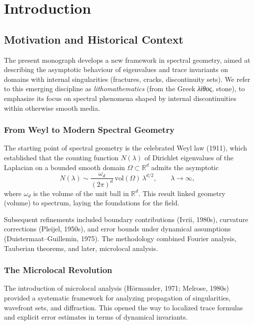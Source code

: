 \chapter{Introduction}

\section{Motivation and Historical Context}

The present monograph develops a new framework in spectral geometry, aimed at 
describing the asymptotic behaviour of eigenvalues and trace invariants on domains 
with internal singularities (fractures, cracks, discontinuity sets). 
We refer to this emerging discipline as \emph{lithomathematics} 
(from the Greek \emph{λίθος}, stone), to emphasize its focus on spectral 
phenomena shaped by internal discontinuities within otherwise smooth media.

\subsection{From Weyl to Modern Spectral Geometry}

The starting point of spectral geometry is the celebrated Weyl law (1911), 
which established that the counting function $N(\lambda)$ of Dirichlet eigenvalues 
of the Laplacian on a bounded smooth domain $\Omega \subset \mathbb{R}^d$ admits the asymptotic
\[
N(\lambda) \sim \frac{\omega_d}{(2\pi)^d} \, \mathrm{vol}(\Omega)\, \lambda^{d/2},
\qquad \lambda \to \infty,
\]
where $\omega_d$ is the volume of the unit ball in $\mathbb{R}^d$.
This result linked geometry (volume) to spectrum, laying the foundations for the field.

Subsequent refinements included boundary contributions (Ivrii, 1980s), curvature corrections 
(Pleijel, 1950s), and error bounds under dynamical assumptions (Duistermaat--Guillemin, 
1975). The methodology combined Fourier analysis, Tauberian theorems, and later, 
microlocal analysis.

\subsection{The Microlocal Revolution}

The introduction of microlocal analysis (Hörmander, 1971; Melrose, 1980s) 
provided a systematic framework for analyzing propagation of singularities, 
wavefront sets, and diffraction. This opened the way to localized trace formulas 
and explicit error estimates in terms of dynamical invariants.

